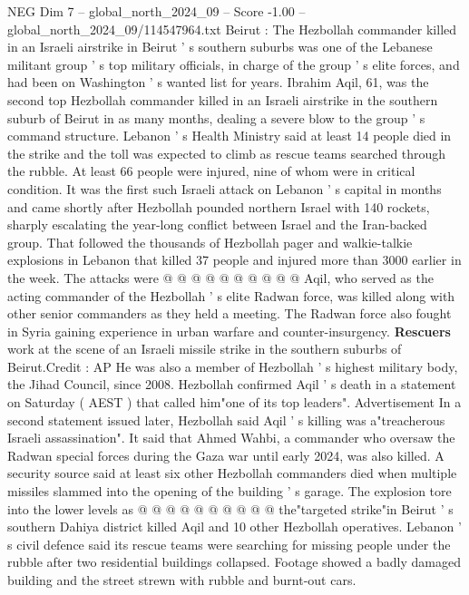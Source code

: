 \begin{textsample}{NEG Dim 7 – global\_north\_2024\_09 – Score -1.00 – global\_north\_2024\_09/114547964.txt}  \label{ex:f7_neg_381}
Beirut : The Hezbollah commander killed in an Israeli airstrike in Beirut ' s southern suburbs was one of the Lebanese militant group ' s top military officials, in charge of the group ' s elite forces, and had been on Washington ' s wanted list for years.
Ibrahim Aqil, 61, was the second top Hezbollah commander killed in an Israeli airstrike in the southern suburb of Beirut in as many months, dealing a severe blow to the group ' s command structure.
Lebanon ' s Health Ministry said at least 14 people died in the strike and the toll was expected to climb as rescue teams searched through the rubble.
At least 66 people were injured, nine of whom were in critical condition.
It was the first such Israeli attack on Lebanon ' s capital in months and came shortly after Hezbollah pounded northern Israel with 140 rockets, sharply escalating the year-long conflict between Israel and the Iran-backed group.
That followed the thousands of Hezbollah pager and walkie-talkie explosions in Lebanon that killed 37 people and injured more than 3000 earlier in the week.
The attacks were @ @ @ @ @ @ @ @ @ @ Aqil, who served as the acting commander of the Hezbollah ' s elite Radwan force, was killed along with other senior commanders as they held a meeting.
The Radwan force also fought in Syria gaining experience in urban warfare and counter-insurgency. \textbf{Rescuers} work at the scene of an Israeli missile strike in the southern suburbs of Beirut.Credit : AP He was also a member of Hezbollah ' s highest military body, the Jihad Council, since 2008.
Hezbollah confirmed Aqil ' s death in a statement on Saturday ( AEST ) that called him"one of its top leaders".
Advertisement In a second statement issued later, Hezbollah said Aqil ' s killing was a"treacherous Israeli assassination".
It said that Ahmed Wahbi, a commander who oversaw the Radwan special forces during the Gaza war until early 2024, was also killed.
A security source said at least six other Hezbollah commanders died when multiple missiles slammed into the opening of the building ' s garage.
The explosion tore into the lower levels as @ @ @ @ @ @ @ @ @ @ the"targeted strike"in Beirut ' s southern Dahiya district killed Aqil and 10 other Hezbollah operatives.
Lebanon ' s civil defence said its rescue teams were searching for missing people under the rubble after two residential buildings collapsed.
Footage showed a badly damaged building and the street strewn with rubble and burnt-out cars.

\end{textsample}
